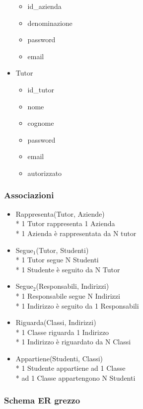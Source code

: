 \documentclass{article}
\begin{document}
\begin{itemize}
\begin{itemize}
        \item id\_azienda
        \item denominazione
        \item password
        \item email
    \end{itemize}
    \item Tutor
    \begin{itemize}
        \item id\_tutor
        \item nome
        \item cognome
        \item password
        \item email
        \item autorizzato
    \end{itemize}
    
\end{itemize}
\subsubsection{Associazioni}
\begin{itemize}
    \item Rappresenta(Tutor, Aziende)\\*
    1 Tutor rappresenta 1 Azienda\\*
    1 Azienda è rappresentata da N tutor
    \item Segue$_1$(Tutor, Studenti)\\*
    1 Tutor segue N Studenti\\*
    1 Studente è seguito da N Tutor
    \item Segue$_2$(Responsabili, Indirizzi)\\*
    1 Responsabile segue N Indirizzi\\*
    1 Indirizzo è seguito da 1 Responsabili
    \item Riguarda(Classi, Indirizzi)\\*
    1 Classe riguarda 1 Indirizzo\\*
    1 Indirizzo è riguardato da N Classi
    \item Appartiene(Studenti, Classi)\\*
    1 Studente appartiene ad 1 Classe\\*
    ad 1 Classe appartengono N Studenti
    
\end{itemize}

\subsubsection{Schema ER grezzo}
\end{document}

